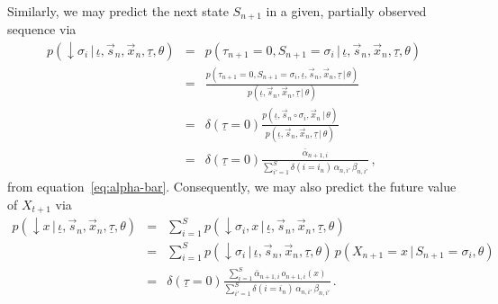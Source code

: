 \documentclass[a4paper]{article}
\newcommand{\dn}{\downarrow\!}
\begin{document}
Similarly, we may predict the next state $S_{n+1}$ in a given, partially observed sequence via
\begin{eqnarray}
  p(\dn\sigma_i\,|\,\underline{\iota},\vec{s}_n,\vec{x}_n,\underline{\tau},\theta)  
& = &
  p(\tau_{n+1}\!=\!0,S_{n+1}\!=\!\sigma_i\,|\,\underline{\iota},\vec{s}_n,\vec{x}_n,\underline{\tau},\theta) 
\nonumber\\& = &
  \frac{p(\tau_{n+1}\!=\!0,S_{n+1}\!=\!\sigma_i,\underline{\iota},\vec{s}_n,\vec{x}_n,\underline{\tau}\,|\,\theta)}
       {p(\underline{\iota},\vec{s}_n,\vec{x}_n,\underline{\tau}\,|\,\theta)}
\nonumber\\& = & 
  \delta(\underline{\tau}\!=\!0)
  \frac{p(\underline{\iota},\vec{s}_n\circ\sigma_i,\vec{x}_n\,|\,\theta)}
       {p(\underline{\iota},\vec{s}_n,\vec{x}_n,\underline{\tau}\,|\,\theta)}
\nonumber\\& = & 
  \delta(\underline{\tau}\!=\!0)
  \frac{\bar{\alpha}_{n+1,i}}
       {\sum_{i'=1}^S\delta(i\!=\!i_n)\,\alpha_{n,i'}\,\beta_{n,i'}}
\,,
\end{eqnarray}
from equation~\eqref{eq:alpha-bar}.
Consequently, we may also predict the future value of $X_{t+1}$ via
\begin{eqnarray}
  p(\dn x\,|\,\underline{\iota},\vec{s}_n,\vec{x}_n,\underline{\tau},\theta)  
& = &
\sum_{i=1}^{S}p(\dn \sigma_i,x\,|\,\underline{\iota},\vec{s}_n,\vec{x}_n,\underline{\tau},\theta) 
\nonumber\\& = &
\sum_{i=1}^{S}p(\dn \sigma_i\,|\,\underline{\iota},\vec{s}_n,\vec{x}_n,\underline{\tau},\theta)\,p(X_{n+1}\!=\!x\,|\,S_{n+1}\!=\!\sigma_i,\theta)
\nonumber\\& = &
  \delta(\underline{\tau}\!=\!0)
  \frac{\sum_{i=1}^{S}\bar{\alpha}_{n+1,i}\,o_{n+1,i}(x)}
       {\sum_{i'=1}^S\delta(i\!=\!i_n)\,\alpha_{n,i'}\,\beta_{n,i'}}\,.
\end{eqnarray}
\end{document}
